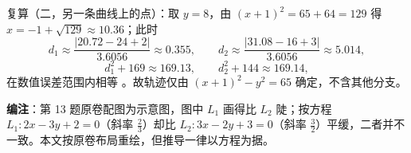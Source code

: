\begin{answer}
复算（二，另一条曲线上的点）：取 $y=8$，由 $(x+1)^2=65+64=129$ 得 $x=-1+\sqrt{129}\approx10.36$；此时
\nopagebreak[4]
\[
d_1\approx\frac{|20.72-24+2|}{3.6056}\approx0.355,\qquad
d_2\approx\frac{|31.08-16+3|}{3.6056}\approx5.014,
\]
\nopagebreak[4]
\[
d_1^2+169\approx169.13,\qquad d_2^2+144\approx169.14,
\]
在数值误差范围内相等 。故轨迹仅由 $(x+1)^2-y^2=65$ 确定，不含其他分支。

\begin{gktip}
\textbf{编注}：第 13 题原卷配图为示意图，图中 $L_1$ 画得比 $L_2$ 陡；按方程 $L_1:2x-3y+2=0$（斜率 $\frac23$）却比 $L_2:3x-2y+3=0$（斜率 $\frac32$）平缓，二者并不一致。本文按原卷布局重绘，但推导一律以方程为据。
\end{gktip}


\end{answer}